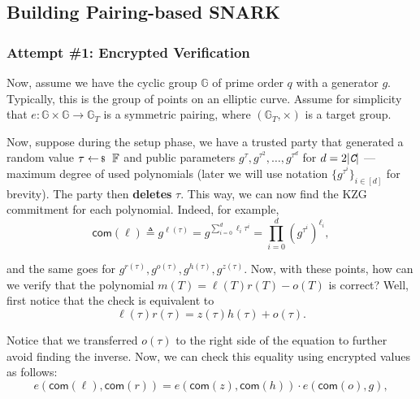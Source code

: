 \documentclass[../../book.tex]{subfiles}
\begin{document}
\subsection{Building Pairing-based SNARK}

\subsubsection{Attempt \#1: Encrypted Verification}

Now, assume we have the cyclic group $\mathbb{G}$ of prime order $q$ with a
generator $g$. Typically, this is the group of points on an elliptic curve.
Assume for simplicity that $e: \mathbb{G} \times \mathbb{G} \to \mathbb{G}_T$ is
a symmetric pairing, where $(\mathbb{G}_T, \times)$ is a target group.

Now, suppose during the setup phase, we have a trusted party that generated a random value $\tau \leftarrowS \mathbb{F}$ and public parameters $g^{\tau},g^{\tau^2},\dots,g^{\tau^{d}}$ for $d=2|\textit{\texttt{C}}|$ --- maximum degree of used polynomials (later we will use notation $\{g^{\tau^i}\}_{i \in [d]}$ for brevity). The party then \textbf{deletes} $\tau$. This way, we can now find the KZG commitment for each polynomial. Indeed, for example,
\begin{equation*}
    \mathsf{com}(\ell) \triangleq g^{\ell(\tau)} = g^{\sum_{i=0}^d \ell_i \tau^i} = \prod_{i=0}^d (g^{\tau^i})^{\ell_i},
\end{equation*}

and the same goes for $g^{r(\tau)}, g^{o(\tau)}, g^{h(\tau)}, g^{z(\tau)}$. Now, with these points, how can we verify that the polynomial $m(T) = \ell(T)r(T) - o(T)$ is correct? Well, first notice that the check is equivalent to
\begin{equation*}
    \ell(\tau)r(\tau) = z(\tau)h(\tau) + o(\tau).
\end{equation*}

Notice that we transferred $o(\tau)$ to the right side of the equation to further avoid finding the inverse. Now, we can check this equality using encrypted values as follows:
\begin{equation*}
    e(\mathsf{com}(\ell), \mathsf{com}(r)) = e(\mathsf{com}(z), \mathsf{com}(h)) \cdot e(\mathsf{com}(o), g),
\end{equation*}
\end{document}
